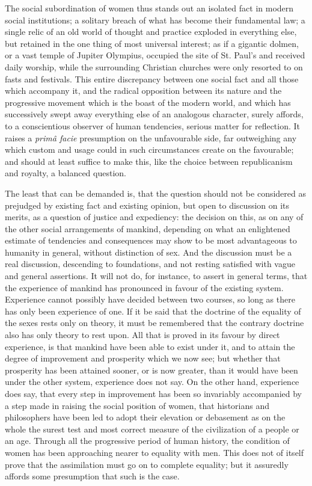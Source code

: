 \documentclass[12pt]{report}
\begin{document}
The social subordination of women thus stands out an isolated fact in modern social institutions; a solitary breach of what has become their fundamental law; a single relic of an old world of thought and practice exploded in everything else, but retained in the one thing of most universal interest; as if a gigantic dolmen, or a vast temple of Jupiter Olympius, occupied the site of St. Paul's and received daily worship, while the surrounding Christian churches were only resorted to on fasts and festivals. This entire discrepancy between one social fact and all those which accompany it, and the radical opposition between its nature and the progressive movement which is the boast of the modern world, and which has successively swept away everything else of an analogous character, surely affords, to a conscientious observer of human tendencies, serious matter for reflection. It raises a \emph{primâ facie} presumption on the unfavourable side, far outweighing any which custom and usage could in such circumstances create on the favourable; and should at least suffice to make this, like the choice between republicanism and royalty, a balanced question.

The least that can be demanded is, that the question should not be considered as prejudged by existing fact and existing opinion, but open to discussion on its merits, as a question of justice and expediency: the decision on this, as on any of the other social arrangements of mankind, depending on what an enlightened estimate of tendencies and consequences may show to be most advantageous to humanity in general, without distinction of sex. And the discussion must be a real discussion, descending to foundations, and not resting satisfied with vague and general assertions. It will not do, for instance, to assert in general terms, that the experience of mankind has pronounced in favour of the existing system. Experience cannot possibly have decided between two courses, so long as there has only been experience of one. If it be said that the doctrine of the equality of the sexes rests only on theory, it must be remembered that the contrary doctrine also has only theory to rest upon. All that is proved in its favour by direct experience, is that mankind have been able to exist under it, and to attain the degree of improvement and prosperity which we now see; but whether that prosperity has been attained sooner, or is now greater, than it would have been under the other system, experience does not say. On the other hand, experience does say, that every step in improvement has been so invariably accompanied by a step made in raising the social position of women, that historians and philosophers have been led to adopt their elevation or debasement as on the whole the surest test and most correct measure of the civilization of a people or an age. Through all the progressive period of human history, the condition of women has been approaching nearer to equality with men. This does not of itself prove that the assimilation must go on to complete equality; but it assuredly affords some presumption that such is the case.
\end{document}
